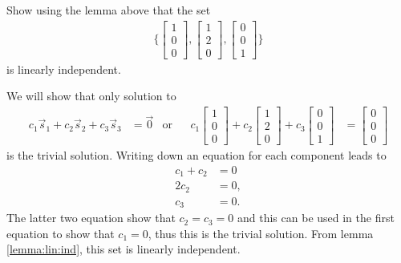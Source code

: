 \begin{example}
Show using the lemma above that the set
%
\begin{align*}
\{
\begin{bmatrix}
1 \\ 0 \\ 0
\end{bmatrix},
\begin{bmatrix}
1 \\ 2 \\ 0
\end{bmatrix},
\begin{bmatrix}
0 \\ 0 \\ 1
\end{bmatrix} \}
\end{align*}
is linearly independent.

\solution

We will show that only solution to
%
\begin{align*}
c_1 \vec{s}_1 + c_2 \vec{s}_2 + c_3 \vec{s}_3 & = \vec{0} & \text{or}&&
c_1 \begin{bmatrix}
1 \\ 0 \\ 0
\end{bmatrix}+ c_2 \begin{bmatrix}
1 \\2  \\ 0
\end{bmatrix} + c_3 \begin{bmatrix}
0 \\ 0 \\ 1
\end{bmatrix} & = \begin{bmatrix}
0 \\ 0 \\ 0
\end{bmatrix}
\end{align*}
is the trivial solution. Writing down an equation for each component leads to
\begin{align*}
c_1 + c_2 & = 0 \\
2 c_2 & = 0, \\
c_3 & = 0.
\end{align*}
The latter two equation show that $c_2=c_3=0$ and this can be used in the first equation to show that $c_1=0$, thus this is the trivial solution.  From lemma \ref{lemma:lin:ind}, this set is linearly independent.
\end{example}

